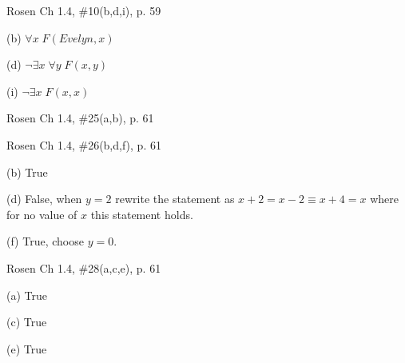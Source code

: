 \documentclass[12pt]{exam}
\newenvironment{my_parts}{
\begin{parts}
    \setlength{\itemsep}{1pt}
    \setlength{\parskip}{0pt}
    \setlength{\parsep}{0pt}
}{\end{parts}}
\newenvironment{my_item}{
\begin{itemize}
    \setlength{\itemsep}{1pt}
    \setlength{\parskip}{0pt}
    \setlength{\parsep}{0pt}
}{\end{itemize}}
\begin{document}
\begin{questions}
\question Rosen Ch 1.4, \#10(b,d,i), p. 59
    \begin{solution}
    \begin{my_item}
        \item[(b)] $\forall x\; F(Evelyn, x)$
        \item[(d)] $\neg \exists x\; \forall y\; F(x,y)$
        \item[(i)] $\neg \exists x\; F(x,x)$ \\
    \end{my_item}
    \end{solution}

\question Rosen Ch 1.4, \#25(a,b), p. 61
    \begin{solution}
    \end{solution}


\question Rosen Ch 1.4, \#26(b,d,f), p. 61
    \begin{solution}
    \begin{my_item}
        \item[(b)] True
        \item[(d)] False, when $y=2$ rewrite the statement as $x + 2 = x - 2 \equiv x+4 = x$ where for no value of $x$ this statement holds.
        \item[(f)] True, choose $y=0$.
    \end{my_item}
    \end{solution}


\question Rosen Ch 1.4, \#28(a,c,e), p. 61
    \begin{solution}
    \begin{my_item}
        \item[(a)] True
        \item[(c)] True
        \item[(e)] True
    \end{my_item}
    \end{solution}



\end{questions}
\end{document}
